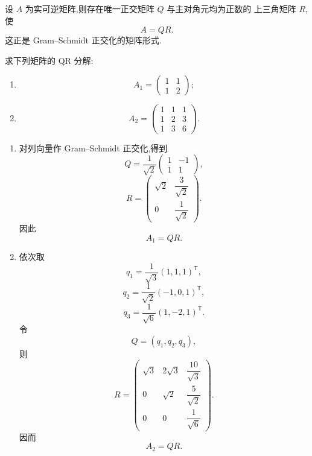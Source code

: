\begin{theorem}[\markstar]
设 $A$ 为实可逆矩阵,则存在唯一正交矩阵 $Q$ 与主对角元均为正数的
上三角矩阵 $R$,使
\[
A=QR.
\]
这正是 Gram--Schmidt 正交化的矩阵形式.
\end{theorem}


\begin{example}
求下列矩阵的 QR 分解:
\begin{enumerate}
    \item
    \[
    A_1=
    \begin{pmatrix}
    1&1\\
    1&2
    \end{pmatrix};
    \]
    \item
    \[
    A_2=
    \begin{pmatrix}
    1&1&1\\
    1&2&3\\
    1&3&6
    \end{pmatrix}.
    \]
\end{enumerate}
\end{example}
\exampleblank

\begin{solution}
\leavevmode
\begin{enumerate}
    \item 对列向量作 Gram--Schmidt 正交化,得到
    \[
    Q=
    \dfrac1{\sqrt2}
    \begin{pmatrix}
    1&-1\\
    1&1
    \end{pmatrix},
    \]
    \[
    R=
    \begin{pmatrix}
    \sqrt2&\dfrac3{\sqrt2}\\[4pt]
    0&\dfrac1{\sqrt2}
    \end{pmatrix}.
    \]
    因此
    \[
    \boxed{A_1=QR}.
    \]

    \item 依次取
    \[
    q_1=\dfrac1{\sqrt3}(1,1,1)^{\mathsf T},
    \]
    \[
    q_2=\dfrac1{\sqrt2}(-1,0,1)^{\mathsf T},
    \]
    \[
    q_3=\dfrac1{\sqrt6}(1,-2,1)^{\mathsf T}.
    \]
    令
    \[
    Q=(q_1,q_2,q_3),
    \]
    则
    \[
    R=
    \begin{pmatrix}
    \sqrt3&2\sqrt3&\dfrac{10}{\sqrt3}\\[4pt]
    0&\sqrt2&\dfrac5{\sqrt2}\\[4pt]
    0&0&\dfrac1{\sqrt6}
    \end{pmatrix}.
    \]
    因而
    \[
    \boxed{A_2=QR}.
    \]
\end{enumerate}
\end{solution}


